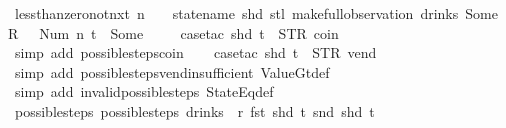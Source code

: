 \begin{isabellebody}
\endisatagproof
{\isafoldproof}%
%
\isadelimproof
\isanewline
%
\endisadelimproof
\isanewline
{}\isamarkupfalse%
\ less{\isacharunderscore}than{\isacharunderscore}zero{\isacharunderscore}not{\isacharunderscore}nxt{\isacharunderscore}{}{\isacharcolon}\ {\isachardoublequoteopen}n\ {\isasymle}\ {}\ {\isasymLongrightarrow}\ {\isasymnot}statename\ {\isacharparenleft}shd\ {\isacharparenleft}stl\ {\isacharparenleft}make{\isacharunderscore}full{\isacharunderscore}observation\ drinks\ {\isacharparenleft}Some\ {}{\isacharparenright}\ {\isacharless}R\ {}\ {\isacharcolon}{\isacharequal}\ Num\ n{\isachargreater}\ t{\isacharparenright}{\isacharparenright}{\isacharparenright}\ {\isacharequal}\ Some\ {}{\isachardoublequoteclose}\isanewline
%
\isadelimproof
\ \ %
\endisadelimproof
%
\isatagproof
{}\isamarkupfalse%
\ {\isacharparenleft}case{\isacharunderscore}tac\ {\isachardoublequoteopen}shd\ t\ {\isacharequal}\ {\isacharparenleft}STR\ {\isacharprime}{\isacharprime}coin{\isacharprime}{\isacharprime}{\isacharcomma}\ {\isacharbrackleft}{\isacharbrackright}{\isacharparenright}{\isachardoublequoteclose}{\isacharparenright}\isanewline
\ \ \ \ \ \ \isamarkupfalse%
\ {\isacharparenleft}simp\ add{\isacharcolon}\ possible{\isacharunderscore}steps{\isacharunderscore}coin{\isacharparenright}\isanewline
\ \ \isamarkupfalse%
\ {\isacharparenleft}case{\isacharunderscore}tac\ {\isachardoublequoteopen}shd\ t\ {\isacharequal}\ {\isacharparenleft}STR\ {\isacharprime}{\isacharprime}vend{\isacharprime}{\isacharprime}{\isacharcomma}\ {\isacharbrackleft}{\isacharbrackright}{\isacharparenright}{\isachardoublequoteclose}{\isacharparenright}\isanewline
\ \ \ \ \ \ \isamarkupfalse%
\ {\isacharparenleft}simp\ add{\isacharcolon}\ possible{\isacharunderscore}steps{\isacharunderscore}vend{\isacharunderscore}insufficient\ ValueGt{\isacharunderscore}def{\isacharparenright}\isanewline
\ \ \isamarkupfalse%
\ {\isacharparenleft}simp\ add{\isacharcolon}\ invalid{\isacharunderscore}possible{\isacharunderscore}steps{\isacharunderscore}{}\ StateEq{\isacharunderscore}def{\isacharparenright}%
\endisatagproof
{\isafoldproof}%
%
\isadelimproof
\isanewline
%
\endisadelimproof
\isanewline
{}\isamarkupfalse%
\ possible{\isacharunderscore}steps{\isacharunderscore}{}{\isacharcolon}\ {\isachardoublequoteopen}possible{\isacharunderscore}steps\ drinks\ {}\ r\ {\isacharparenleft}fst\ {\isacharparenleft}shd\ t{\isacharparenright}{\isacharparenright}\ {\isacharparenleft}snd\ {\isacharparenleft}shd\ t{\isacharparenright}{\isacharparenright}\ {\isacharequal}\ {\isacharbraceleft}{\isacharbar}{\isacharbar}{\isacharbraceright}{\isachardoublequoteclose}\isanewline

\end{isabellebody}
